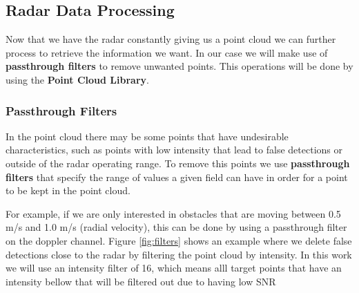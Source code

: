 \subsection{Radar Data Processing}
Now that we have the radar constantly giving us a point cloud we can further process to retrieve the information we want. 
In our case we will make use of \textbf{passthrough filters} to remove unwanted points. This operations will be done by using the \textbf{Point Cloud Library}.
\subsubsection{Passthrough Filters}
In the point cloud there may be some points that have undesirable characteristics, such as points with low intensity  that lead to false detections or outside of the radar operating range. To remove this points we use \textbf{passthrough filters} that specify the range of values a given field can have in order for a point to be kept in the point cloud. 

For example, if we are only interested in obstacles that are moving between 0.5 m/s and 1.0 m/s (radial velocity), this can be done by using a passthrough filter on the doppler channel.
Figure \ref{fig:filters} shows an example where we delete false detections close to the radar by filtering the point cloud by intensity. In this work we will use an intensity filter of 16, which means alll target points that have an intensity bellow that will be filtered out due to having low \ac{SNR}



